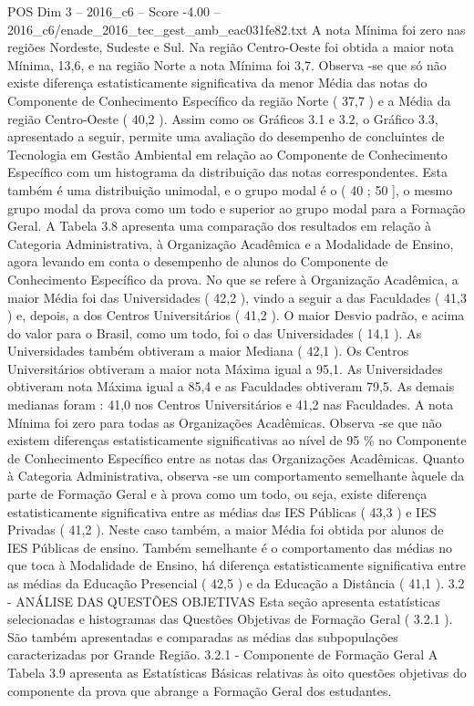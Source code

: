 \begin{textsample}{POS Dim 3 – 2016\_c6 – Score -4.00 – 2016\_c6/enade\_2016\_tec\_gest\_amb\_eac031fe82.txt}
A nota Mínima foi zero nas regiões Nordeste, Sudeste e Sul.
Na região Centro-Oeste foi obtida a maior nota Mínima, 13,6, e na região Norte a nota Mínima foi 3,7.
Observa -se que só não existe diferença estatisticamente significativa da menor Média das notas do Componente de Conhecimento Específico da região Norte ( 37,7 ) e a Média da região Centro-Oeste ( 40,2 ).
Assim como os Gráficos 3.1 e 3.2, o Gráfico 3.3, apresentado a seguir, permite uma avaliação do desempenho de concluintes de Tecnologia em Gestão Ambiental em relação ao Componente de Conhecimento Específico com um histograma da distribuição das notas correspondentes.
Esta também é uma distribuição unimodal, e o grupo modal é o ( 40 ; 50 ], o mesmo grupo modal da prova como um todo e superior ao grupo modal para a Formação Geral.
A Tabela 3.8 apresenta uma comparação dos resultados em relação à Categoria Administrativa, à Organização Acadêmica e a Modalidade de Ensino, agora levando em conta o desempenho de alunos do Componente de Conhecimento Específico da prova.
No que se refere à Organização Acadêmica, a maior Média foi das Universidades ( 42,2 ), vindo a seguir a das Faculdades ( 41,3 ) e, depois, a dos Centros Universitários ( 41,2 ).
O maior Desvio padrão, e acima do valor para o Brasil, como um todo, foi o das Universidades ( 14,1 ).
As Universidades também obtiveram a maior Mediana ( 42,1 ).
Os Centros Universitários obtiveram a maior nota Máxima igual a 95,1.
As Universidades obtiveram nota Máxima igual a 85,4 e as Faculdades obtiveram 79,5.
As demais medianas foram : 41,0 nos Centros Universitários e 41,2 nas Faculdades.
A nota Mínima foi zero para todas as Organizações Acadêmicas.
Observa -se que não existem diferenças estatisticamente significativas ao nível de 95 \% no Componente de Conhecimento Específico entre as notas das Organizações Acadêmicas.
Quanto à Categoria Administrativa, observa -se um comportamento semelhante àquele da parte de Formação Geral e à prova como um todo, ou seja, existe diferença estatisticamente significativa entre as médias das IES Públicas ( 43,3 ) e IES Privadas ( 41,2 ).
Neste caso também, a maior Média foi obtida por alunos de IES Públicas de ensino.
Também semelhante é o comportamento das médias no que toca à Modalidade de Ensino, há diferença estatisticamente significativa entre as médias da Educação Presencial ( 42,5 ) e da Educação a Distância ( 41,1 ). 3.2 - ANÁLISE DAS QUESTÕES OBJETIVAS Esta seção apresenta estatísticas selecionadas e histogramas das Questões Objetivas de Formação Geral ( 3.2.1 ).
São também apresentadas e comparadas as médias das subpopulações caracterizadas por Grande Região. 3.2.1 - Componente de Formação Geral A Tabela 3.9 apresenta as Estatísticas Básicas relativas às oito questões objetivas do componente da prova que abrange a Formação Geral dos estudantes.

\end{textsample}
